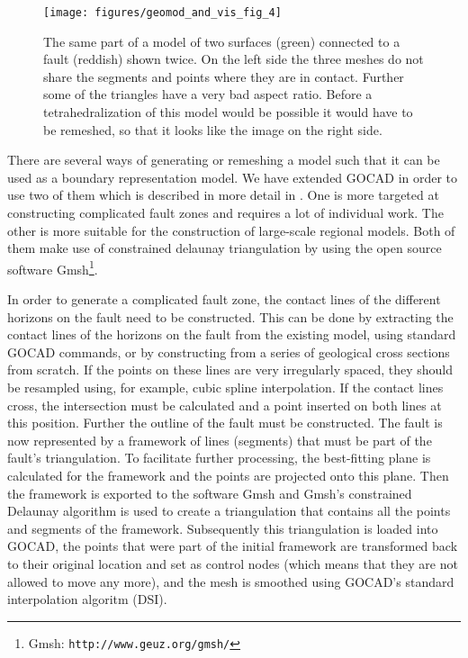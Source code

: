 \begin{figure}[tb]
\begin{center}
\texttt{[image: figures/geomod\_and\_vis\_fig\_4]}
\caption{The same part of a model of two surfaces (green) connected to a fault (reddish) shown twice. On the left side the three meshes do not share the segments and points where they are in contact. Further some of the triangles have a very bad aspect ratio. Before a tetrahedralization of this model would be possible it would have to be remeshed, so that it looks like the image on the right side.}
\label{geomod_and_vis:4}
\end{center}
\end{figure}

There are several ways of generating or remeshing a model such that it can be used as a boundary representation model. We have extended GOCAD in order to use two of them which is described in more detail in \cite{Zehner2011:Gocad}. One is more targeted at constructing complicated fault zones and requires a lot of individual work. The other is more suitable for the construction of large-scale regional models. Both of them make use of constrained delaunay triangulation by using the open source software Gmsh\footnote{Gmsh: \texttt{http://www.geuz.org/gmsh/}}.

In order to generate a complicated fault zone, the contact lines of the different horizons on the fault need to be constructed. This can be done by extracting the contact lines of the horizons on the fault from the existing model, using standard GOCAD commands, or by constructing from a series of geological cross sections from scratch. If the points on these lines are very irregularly spaced, they should be resampled using, for example, cubic spline interpolation. If the contact lines cross, the intersection must be calculated and a point inserted on both lines at this position. Further the outline of the fault must be constructed. The fault is now represented by a framework of lines (segments) that must be part of the fault's triangulation. To facilitate further processing, the best-fitting plane is calculated for the framework and the points are projected onto this plane. Then the framework is exported to the software Gmsh and Gmsh's constrained Delaunay algorithm is used to create a triangulation that contains all the points and segments of the framework. Subsequently this triangulation is loaded into GOCAD, the points that were part of the initial framework are transformed back to their original location and set as control nodes (which means that they are not allowed to move any more), and the mesh is smoothed using GOCAD's standard interpolation algoritm (DSI).

